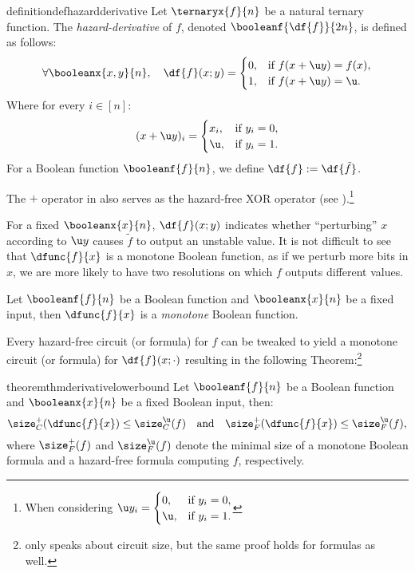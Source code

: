 \documentclass[acmsmall, nonacm, authorversion]{acmart}
\begin{document}
\begin{restatable}{definition}{defhazardderivative}\label{def:hazard-derivative} 
Let $\ternaryx{f}{n}$ be a natural ternary function. The \emph{hazard-derivative} of $f$, denoted $\booleanf{\df{f}}{2n}$, is defined as follows:
\[
    \forall\booleanx{x,y}{n}, \quad \df{f}(x;y)=\begin{cases}
      0, & \text{if $f(x+\u y)=f(x)$},\\
      1, & \text{if $f(x+\u y)=\u$}.\\
    \end{cases}
\]
Where for every $i\in[n]$: 
\[
    (x+\u y)_{i}=\begin{cases}
      x_{i}, & \text{if $y_{i}=0$},\\
      \u, & \text{if $y_{i}=1$}.\\
    \end{cases}
\]
For a Boolean function $\booleanf{f}{n}$, we define $\df{f}:=\df{\tilde{f}}$. 
\end{restatable}

The $+$ operator in  also serves as the hazard-free XOR operator (see ).\footnote{When considering $\u y_{i}=\begin{cases}
      0, & \text{if $y_{i}=0$},\\
      \u, & \text{if $y_{i}=1$}.\\
    \end{cases}$}

For a fixed $\booleanx{x}{n}$, $\df{f}(x;y)$ indicates whether ``perturbing'' $x$ according to $\u y$ causes $\tilde{f}$ to output an unstable value.
It is not difficult to see that $\dfunc{f}{x}$ is a monotone Boolean function, as if we perturb more bits in $x$, we are more likely to have two resolutions on which $f$ outputs different values. 

\begin{lemma}\label{lem:derivative-monotone}
Let $\booleanf{f}{n}$ be a Boolean function and $\booleanx{x}{n}$ be a fixed input, then $\dfunc{f}{x}$ is a \emph{monotone} Boolean function.
\end{lemma}

Every hazard-free circuit (or formula) for $f$ can be tweaked to yield a monotone circuit (or formula) for $\df{f}(x;\cdot)$ resulting in the following Theorem:\footnote{\cite[Theorem 4.9]{IKL+19} only speaks about circuit size, but the same proof holds for formulas as well.} 
\begin{restatable}{theorem}{thmderivativelowerbound}\label{thm:derivative-lower-bound}
Let $\booleanf{f}{n}$ be a Boolean function and $\booleanx{x}{n}$ be a fixed Boolean input, then: 
\[
\size_{C}^{+}(\dfunc{f}{x})  \le \size_{C}^{\u}(f) \quad \text{and}\quad
\size_{F}^{+}(\dfunc{f}{x})  \le \size_{F}^{\u}(f),
\]
where $\size_F^{+}(f)$ and $\size_{F}^{\u}(f)$ denote the minimal size of a monotone Boolean formula  and a hazard-free formula computing $f$, respectively.
\end{restatable}
\end{document}
